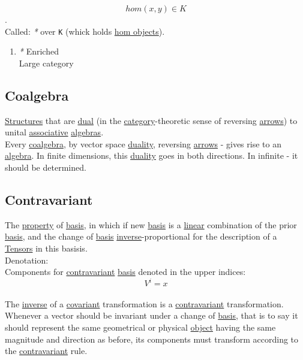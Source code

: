 \documentclass[11pt]{article}
\begin{document}
$$ hom(x,y) \in K $$.\\

Called: \emph{*} over \texttt{K} (whick holds \hyperref[orgd86d90e]{hom objects}).\\

\begin{enumerate}
\item \emph{*}
\label{sec:org70e3ce2}
\label{orgc0d8c10}Enriched\\
\label{org112e451}Large category\\
\end{enumerate}

\subsection{\label{org4a1da7b}Coalgebra}
\label{sec:org38a3cb2}
\hyperref[orgc87c48c]{Structures} that are \hyperref[org28cefbe]{dual} (in the \hyperref[org0450535]{category}-theoretic sense of reversing \hyperref[org9c45dc6]{arrows}) to unital \hyperref[orgbef8a27]{associative} \hyperref[org908535d]{algebras}.\\
Every \hyperref[org4a1da7b]{coalgebra}, by vector space \hyperref[orgb11fc21]{duality}, reversing \hyperref[org9c45dc6]{arrows} - gives rise to an \hyperref[orgecfec51]{algebra}. In finite dimensions, this \hyperref[orgb11fc21]{duality} goes in both directions. In infinite - it should be determined.\\

\subsection{\label{orge1bb5ad}Contravariant}
\label{sec:orge03f105}
The \hyperref[orgf8c3cc7]{property} of \hyperref[org27d3d18]{basis}, in which if new \hyperref[org27d3d18]{basis} is a \hyperref[orgbbe89e9]{linear} combination of the prior \hyperref[org27d3d18]{basis}, and the change of \hyperref[org27d3d18]{basis} \hyperref[org0da4e7e]{inverse}-proportional for the description of a \hyperref[orgafb2e6d]{Tensors} in this basisis.\\

Denotation:\\
Components for \hyperref[orge1bb5ad]{contravariant} \hyperref[org27d3d18]{basis} denoted in the upper indices:\\
$$ V^{i} = x $$\\

The \hyperref[org0da4e7e]{inverse} of a \hyperref[org71a3b16]{covariant} transformation is a \hyperref[orge1bb5ad]{contravariant} transformation. Whenever a vector should be invariant under a change of \hyperref[org27d3d18]{basis}, that is to say it should represent the same geometrical or physical \hyperref[org4be0e9d]{object} having the same magnitude and direction as before, its components must transform according to the \hyperref[orge1bb5ad]{contravariant} rule.\\
\end{document}
